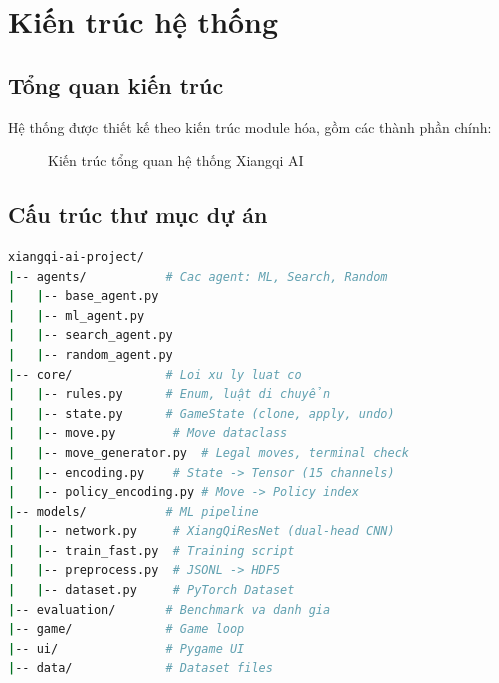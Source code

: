 \section{Kiến trúc hệ thống}

\subsection{Tổng quan kiến trúc}
Hệ thống được thiết kế theo kiến trúc module hóa, gồm các thành phần chính:

\begin{figure}[H]
\centering
{}
\caption{Kiến trúc tổng quan hệ thống Xiangqi AI}
\end{figure}

\subsection{Cấu trúc thư mục dự án}
\begin{lstlisting}[language=bash, caption=Cấu trúc thư mục]
xiangqi-ai-project/
|-- agents/           # Cac agent: ML, Search, Random
|   |-- base_agent.py
|   |-- ml_agent.py
|   |-- search_agent.py
|   |-- random_agent.py
|-- core/             # Loi xu ly luat co
|   |-- rules.py      # Enum, luật di chuyển
|   |-- state.py      # GameState (clone, apply, undo)
|   |-- move.py        # Move dataclass
|   |-- move_generator.py  # Legal moves, terminal check
|   |-- encoding.py    # State -> Tensor (15 channels)
|   |-- policy_encoding.py # Move -> Policy index
|-- models/           # ML pipeline
|   |-- network.py     # XiangQiResNet (dual-head CNN)
|   |-- train_fast.py  # Training script
|   |-- preprocess.py  # JSONL -> HDF5
|   |-- dataset.py     # PyTorch Dataset
|-- evaluation/       # Benchmark va danh gia
|-- game/             # Game loop
|-- ui/               # Pygame UI
|-- data/             # Dataset files
\end{lstlisting}

